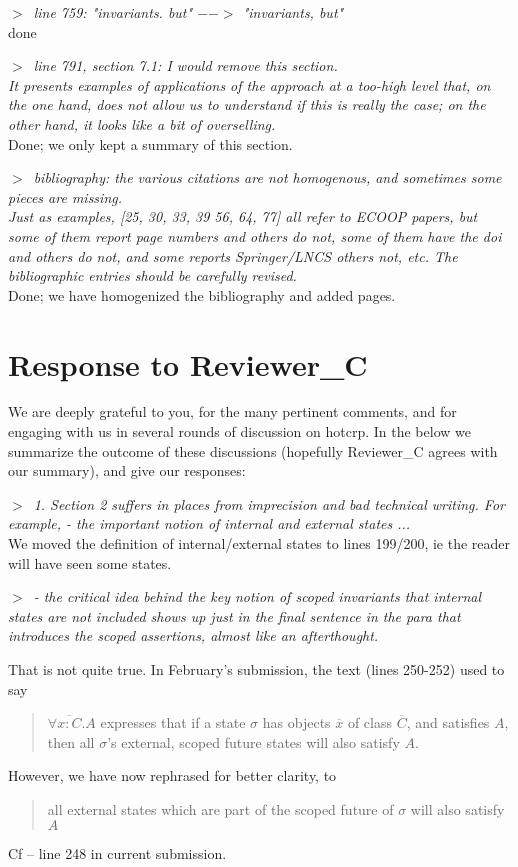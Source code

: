 \documentclass{article}
\newcommand{\pair}[2]{\noindent $>$\  \emph{#1}   \\ {#2}\\ \vspace{.1pt}}
\begin{document}
\pair{line 759: "invariants. but" $-->$  "invariants, but"}
{done}

\pair{line 791, section 7.1: I would remove this section.\\
 It presents examples of applications of the approach at a too-high level that, on the one hand, does not allow us to understand if this is really the case; on the other hand, it looks like a bit of overselling.}
{Done; we only kept a summary of this section.}

\pair{bibliography: the various citations are not homogenous, and sometimes some pieces are missing. \\
Just as examples, [25, 30, 33, 39 56, 64, 77] all refer to ECOOP papers, but some of them report page numbers and others do not, some of them have the doi and others do not, and some reports Springer/LNCS others not, etc. The bibliographic entries should be carefully revised.}
{Done; we have homogenized the bibliography and added pages.}

\section{Response to Reviewer\_C}

We are deeply grateful to you, for the many pertinent comments, and for engaging with us in several rounds of discussion on hotcrp.
In the below we summarize the outcome of these discussions (hopefully Reviewer\_C agrees with our summary), and give our responses:

\vspace{.1cm}

\pair{1. Section 2  suffers in places from imprecision and bad technical writing. For example,   - the important notion of internal and external states ... }
{We moved the definition of internal/external states  to lines 199/200, ie the reader will have seen some states.}

\pair{- the critical idea behind the key notion of scoped invariants that internal states are not included shows up just in the final sentence in the para that introduces the scoped assertions, almost like an afterthought. }
{That is not quite true. In February’s submission, the text (lines 250-252) used to say 
    \begin{quote} $\forall  \overline {x:C}.A$ expresses that if a state $\sigma$  has objects $\overline x$ of class $\overline C$, and satisfies  $A$, then all $\sigma$'s external, scoped future states will also satisfy $A$.
    \end{quote}
However, we have now rephrased for better clarity, to   \begin{quote} 
all external states which are part of the scoped future of $\sigma$ will also satisfy $A$  \end{quote}
Cf -- line 248 in current submission.
}
\end{document}
